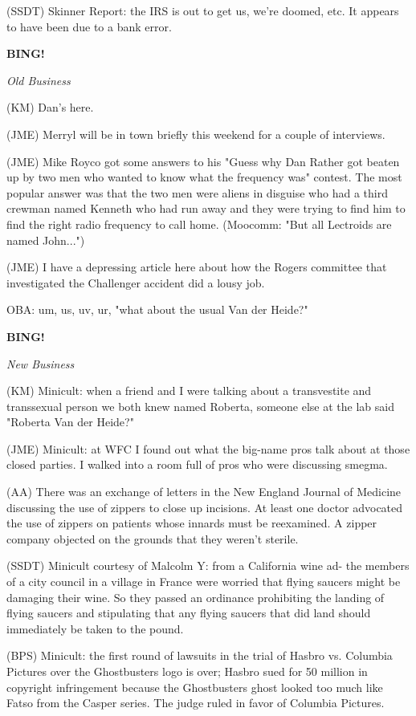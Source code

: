 \documentclass[12pt]{article}
\newcommand{\bing}{{\bf BING!} }
\newcommand{\goto}[1]{\bing \vskip 12pt \centerline{{\em{#1}}}}
\begin{document}
(SSDT) Skinner Report: the IRS is out to get us, we're doomed, etc. It appears to have been due to a bank error.

\goto{Old Business}

(KM) Dan's here.

(JME) Merryl will be in town briefly this weekend for a couple of interviews.

(JME) Mike Royco got some answers to his "Guess why Dan Rather got beaten up by two men who wanted to know what the frequency was" contest. The most popular answer was that the two men were aliens in disguise who had a third crewman named Kenneth who had run away and they were trying to find him to find the right radio frequency to call home. (Moocomm: "But all Lectroids are named John...")

(JME) I have a depressing article here about how the Rogers committee that investigated the Challenger accident did a lousy job.

OBA: um, us, uv, ur, "what about the usual Van der Heide?"

\goto{New Business}

(KM) Minicult: when a friend and I were talking about a transvestite and transsexual person we both knew named Roberta, someone else at the lab said "Roberta Van der Heide?"

(JME) Minicult: at WFC I found out what the big-name pros talk about at those closed parties. I walked into a room full of pros who were discussing smegma.

(AA) There was an exchange of letters in the New England Journal of Medicine discussing the use of zippers to close up incisions. At least one doctor advocated the use of zippers on patients whose innards must be reexamined. A zipper company objected on the grounds that they weren't sterile.

(SSDT) Minicult courtesy of Malcolm Y: from a California wine ad- the members of a city council in a village in France were worried that flying saucers might be damaging their wine. So they passed an ordinance prohibiting the landing of flying saucers and stipulating that any flying saucers that did land should immediately be taken to the pound.

(BPS) Minicult: the first round of lawsuits in the trial of Hasbro vs. Columbia Pictures over the Ghostbusters logo is over; Hasbro sued for 50 million in copyright infringement because the Ghostbusters ghost looked too much like Fatso from the Casper series. The judge ruled in favor of Columbia Pictures.
\end{document}

